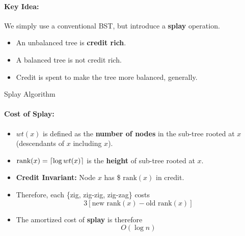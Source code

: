 \documentclass[a4paper,12pt]{report}
\DeclarePairedDelimiter{\ceil}{\lceil}{\rceil}
\begin{document}
\paragraph{Key Idea: } We simply use a conventional BST, but introduce a \textbf{splay} operation.
\begin{itemize}
\item An unbalanced tree is \textbf{credit rich}.
\item A balanced tree is not credit rich.
\item Credit is spent to make the tree more balanced, generally.
\end{itemize}


\begin{algorithm}[H]
\SetAlgoLined
{}
	\BlankLine
	\BlankLine
	\caption{Splay Algorithm}
\end{algorithm}


\paragraph{Cost of Splay: } 
\begin{itemize}
\item $wt(x)$ is defined as the \textbf{number of nodes} in the sub-tree rooted at $x$ (descendants of $x$ including $x$).
\item $\text{rank}(x) = \ceil{\log wt(x)}$ is the \textbf{height} of sub-tree rooted at $x$.
\item \textbf{Credit Invariant: } Node $x$ has \$ $\text{rank}(x)$ in credit. 
\item Therefore, each \{zig, zig-zig, zig-zag\} costs $$3[\text{new rank}(x) - \text{old rank}(x)]$$
\item The amortized cost of \textbf{splay} is therefore $$O(\log n)$$
\end{itemize}
\end{document}

